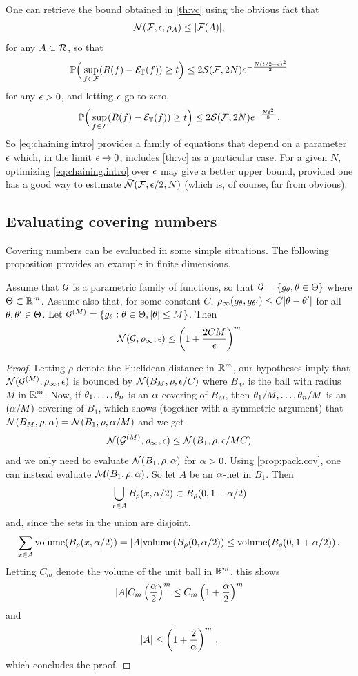One can retrieve the bound obtained in  \cref{th:vc} using the obvious fact that 
\[
{\mathcal N}({\mathcal F}, \epsilon, \rho_{A}) \leq  |{\mathcal F}(A)|,
\]
for any $A\subset {\mathcal R}$, so that 
\[
\bm{\mathbb P}\Big(\sup_{f\in{\mathcal F}} (R(f) - {\mathcal E}_{\mathbb T}(f)) \geq t\Big) \leq 2  {\mathcal S}({\mathcal F}, 2N) e^{-\frac{N(t/2-\epsilon)^2}{2}}
\]
for any $\epsilon>0$, and letting $\epsilon$ go to zero, 
\[
\bm{\mathbb P}\Big(\sup_{f\in{\mathcal F}} (R(f) - {\mathcal E}_{\mathbb T}(f)) \geq t\Big) \leq 2  {\mathcal S}({\mathcal F}, 2N) e^{-\frac{Nt^2}{8}}\,.
\]
So \eqref{eq:chaining.intro} provides a family of equations that depend on a parameter $\epsilon$ which, in the limit $\epsilon\to 0$, includes  \cref{th:vc} as a particular case. For a given $N$, optimizing \cref{eq:chaining.intro} over $\epsilon$ may give a better upper bound, provided one has a good way to estimate $\bar {{\mathcal N}}({\mathcal F}, \epsilon/2, N)$ (which is, of course,  far from obvious).

\subsection{Evaluating covering numbers}
Covering numbers can be evaluated in some simple situations. The following proposition provides an example in finite dimensions. 
\begin{proposition}
\label{prop:ent.numb.param}
Assume that  ${\mathcal G}$ is a parametric family of functions, so that ${\mathcal G} = \left\{ g_\theta, \theta \in \Theta \right\}$ where $\Theta \subset {\mathbb{R}}^m$. Assume also that, for some constant $C$, $\rho_\infty(g_\theta, g_{\theta'}) \leq C |\theta - \theta'|$ for all $\theta, \theta'\in \Theta$. 
Let ${\mathcal G}^{(M)} = \left\{ g_\theta: \theta \in \Theta, |\theta| \leq M \right\}$. Then
\[
{\mathcal N}({\mathcal G}, \rho_\infty, \epsilon) \leq \left(1 + \frac{2CM}{\epsilon}\right)^m
\]
\end{proposition}
\begin{proof}
Letting $\rho$ denote the Euclidean distance in ${\mathbb{R}}^m$, our hypotheses imply that ${\mathcal N}({\mathcal G}^{(M)}, \rho_\infty, \epsilon)$ is bounded by ${\mathcal N}(B_M, \rho, \epsilon/C)$ where $B_M$ is the ball with radius $M$ in ${\mathbb{R}}^m$. Now, if $\theta_1, \dots, \theta_n$ is an $\alpha$-covering of $B_M$, then $\theta_1/M, \dots, \theta_n/M$ is an $(\alpha/M)$-covering of $B_1$, which shows (together with a symmetric argument) that ${\mathcal N}(B_M, \rho, \alpha) = {\mathcal N}(B_1, \rho, \alpha/M)$ and we get
\[
{\mathcal N}({\mathcal G}^{(M)}, \rho_\infty, \epsilon) \leq {\mathcal N}(B_1, \rho, \epsilon/MC)
\]
and we only need to evaluate ${\mathcal N}(B_1, \rho, \alpha)$ for $\alpha > 0$. Using  \cref{prop:pack.cov}, one can instead evaluate ${\mathcal M}(B_1, \rho, \alpha)$. So let $A$ be an $\alpha$-net in $B_1$. Then
\[
\bigcup_{x\in A} B_\rho(x, \alpha/2) \subset B_\rho(0, 1+\alpha/2)
\]
and, since the sets in the union are disjoint, 
\[
\sum_{x\in A} \mathrm{volume}(B_\rho(x, \alpha/2)) = |A| \mathrm{volume}(B_\rho(0, \alpha/2)) \leq \mathrm{volume}(B_\rho(0, 1+\alpha/2))\,.
\]
Letting $C_m$ denote the volume of the unit ball in ${\mathbb{R}}^m$, this shows
\[
|A| C_m \left(\frac{\alpha} 2\right)^m \leq C_m \left(1 + \frac{\alpha} 2\right)^m
\]
and 
\[
|A| \leq \left(1 + \frac2 {\alpha}\right)^m\,,
\]
which concludes the proof.
\end{proof}

